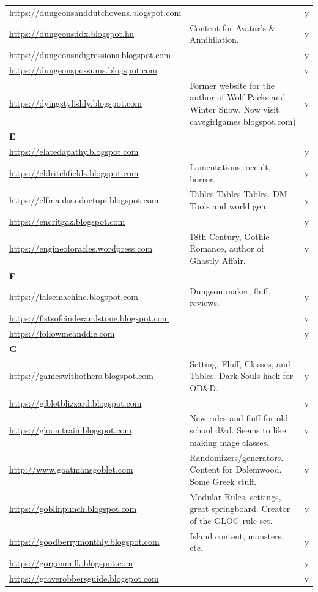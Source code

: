 \documentclass[a4paper, 11pt, twoside]{article}
\begin{document}
\begin{longtable}{p{6cm}p{8cm}c}
\url{https://dungeonsanddutchovens.blogspot.com} &  & y\\
\url{https://dungeonsddx.blogspot.hu} & Content for Avatar's \& Annihilation. & y\\
\url{https://dungeonsndigressions.blogspot.com} &  & y\\
\url{https://dungeonspossums.blogspot.com} &  & y\\
\url{https://dyingstylishly.blogspot.com} & Former website for the author of Wolf Packs and Winter Snow. Now visit cavegirlgames.blogspot.com) & y\\
\textbf{E} &  & \\
\url{https://elatedapathy.blogspot.com} &  & y\\
\url{https://eldritchfields.blogspot.com} & Lamentations, occult, horror. & y\\
\url{https://elfmaidsandoctopi.blogspot.com} & Tables Tables Tables. DM Tools and world gen. & y\\
\url{https://encritgaz.blogspot.com} &  & y\\
\url{https://engineoforacles.wordpress.com} & 18th Century, Gothic Romance, author of Ghastly Affair. & y\\
\textbf{F} &  & \\
\url{https://falsemachine.blogspot.com} & Dungeon maker, fluff, reviews. & y\\
\url{https://fistsofcinderandstone.blogspot.com} &  & y\\
\url{https://followmeanddie.com} &  & y\\
\textbf{G} &  & \\
\url{https://gameswithothers.blogspot.com} & Setting, Fluff, Classes, and Tables. Dark Souls hack for OD\&D. & y\\
\url{https://gibletblizzard.blogspot.com} &  & y\\
\url{https://gloomtrain.blogspot.com} & New rules and fluff for old-school d\&d. Seems to like making mage classes. & y\\
\url{http://www.goatmansgoblet.com} & Randomizers/generators. Content for Dolemwood. Some Greek stuff. & y\\
\url{https://goblinpunch.blogspot.com} & Modular Rules, settings, great springboard. Creator of the GLOG rule set. & y\\
\url{https://goodberrymonthly.blogspot.com} & Island content, monsters, etc. & y\\
\url{https://gorgonmilk.blogspot.com} &  & y\\
\url{https://graverobbersguide.blogspot.com} &  & y\\

\end{longtable}
\end{document}

